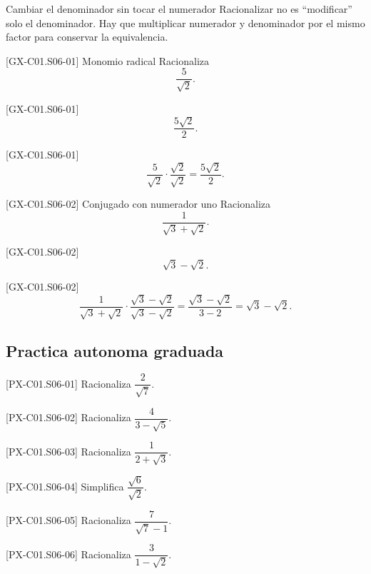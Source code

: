 \begin{commonerror}{Cambiar el denominador sin tocar el numerador}
Racionalizar no es ``modificar'' solo el denominador. Hay que multiplicar numerador y
denominador por el mismo factor para conservar la equivalencia.
\end{commonerror}

\begin{guidedexercise}{[GX-C01.S06-01] Monomio radical}
Racionaliza
\[
\frac{5}{\sqrt{2}}.
\]
\end{guidedexercise}

\begin{shortanswer}{[GX-C01.S06-01]}
\[
\frac{5\sqrt{2}}{2}.
\]
\end{shortanswer}

\begin{fullsolution}{[GX-C01.S06-01]}
\[
\frac{5}{\sqrt{2}}\cdot\frac{\sqrt{2}}{\sqrt{2}}=\frac{5\sqrt{2}}{2}.
\]
\end{fullsolution}

\begin{guidedexercise}{[GX-C01.S06-02] Conjugado con numerador uno}
Racionaliza
\[
\frac{1}{\sqrt{3}+\sqrt{2}}.
\]
\end{guidedexercise}

\begin{shortanswer}{[GX-C01.S06-02]}
\[
\sqrt{3}-\sqrt{2}.
\]
\end{shortanswer}

\begin{fullsolution}{[GX-C01.S06-02]}
\[
\frac{1}{\sqrt{3}+\sqrt{2}}\cdot\frac{\sqrt{3}-\sqrt{2}}{\sqrt{3}-\sqrt{2}}
=\frac{\sqrt{3}-\sqrt{2}}{3-2}
=\sqrt{3}-\sqrt{2}.
\]
\end{fullsolution}

\subsection*{Practica autonoma graduada}
\begin{exercise}{[PX-C01.S06-01] Racionaliza \(\dfrac{2}{\sqrt{7}}\).}
\end{exercise}
\begin{exercise}{[PX-C01.S06-02] Racionaliza \(\dfrac{4}{3-\sqrt{5}}\).}
\end{exercise}
\begin{exercise}{[PX-C01.S06-03] Racionaliza \(\dfrac{1}{2+\sqrt{3}}\).}
\end{exercise}
\begin{exercise}{[PX-C01.S06-04] Simplifica \(\dfrac{\sqrt{6}}{\sqrt{2}}\).}
\end{exercise}
\begin{exercise}{[PX-C01.S06-05] Racionaliza \(\dfrac{7}{\sqrt{7}-1}\).}
\end{exercise}
\begin{exercise}{[PX-C01.S06-06] Racionaliza \(\dfrac{3}{1-\sqrt{2}}\).}
\end{exercise}


